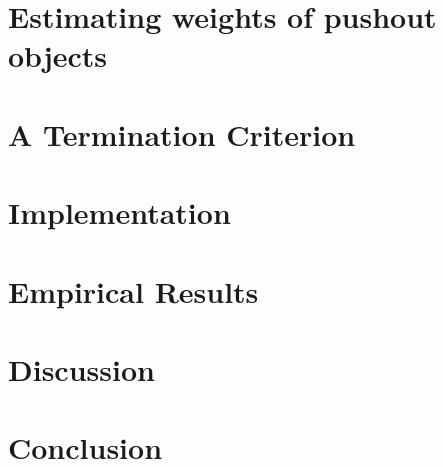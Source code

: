 \documentclass{book}
\begin{document}
%  
  
\section{Estimating weights of pushout objects} 
\label{sec:type_graph:weighing_pushout} 
  

\section{A Termination Criterion}
\label{sec:type_graph:termination}
   
  
% 

\section{Implementation}
\label{sec:type_graph:implementation}
 


%  

\section{Empirical Results}
\label{sec:type_graph:result}
 

\section{Discussion}
\label{sec:type_graph:related_work}


\section{Conclusion}
\label{sec:type_graph:conclusion}

 
\end{document}
